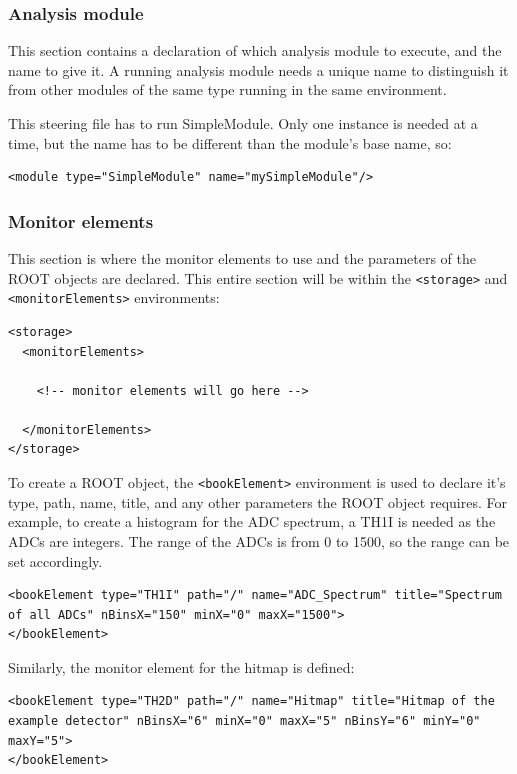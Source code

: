 \subsubsection{Analysis module}
This section contains a declaration of which analysis module to execute, and the name to give it. A running analysis module needs a unique name to distinguish it from other modules of the same type running in the same environment.

This steering file has to run SimpleModule. Only one instance is needed at a time, but the name has to be different than the module's base name, so:

\begin{lstlisting}
<module type="SimpleModule" name="mySimpleModule"/>
\end{lstlisting}

\subsubsection{Monitor elements}
This section is where the monitor elements to use and the parameters of the ROOT objects are declared. This entire section will be within the \texttt{<storage>} and \texttt{<monitorElements>} environments:

\begin{lstlisting}
<storage>
  <monitorElements>

    <!-- monitor elements will go here -->

  </monitorElements>
</storage>
\end{lstlisting}

To create a ROOT object, the \texttt{<bookElement>} environment is used to declare it's type, path, name, title, and any other parameters the ROOT object requires. For example, to create a histogram for the \acrshort{ADC} spectrum, a TH1I is needed as the \acrshort{ADC}s are integers. The range of the \acrshort{ADC}s is from 0 to 1500, so the range can be set accordingly.

\begin{lstlisting}
<bookElement type="TH1I" path="/" name="ADC_Spectrum" title="Spectrum of all ADCs" nBinsX="150" minX="0" maxX="1500">
</bookElement>
\end{lstlisting}

Similarly, the monitor element for the hitmap is defined:

\begin{lstlisting}
<bookElement type="TH2D" path="/" name="Hitmap" title="Hitmap of the example detector" nBinsX="6" minX="0" maxX="5" nBinsY="6" minY="0" maxY="5">
</bookElement>
\end{lstlisting}

